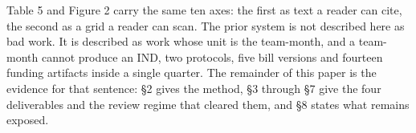 Table 5 and Figure 2 carry the same ten axes: the first as text a reader can
cite, the second as a grid a reader can scan. The prior system is not described
here as bad work. It is described as work whose unit is the team-month, and a
team-month cannot produce an IND, two protocols, five bill versions and fourteen
funding artifacts inside a single quarter. The remainder of this paper is the
evidence for that sentence: \S2 gives the method, \S3 through \S7 give the four
deliverables and the review regime that cleared them, and \S8 states what
remains exposed.

